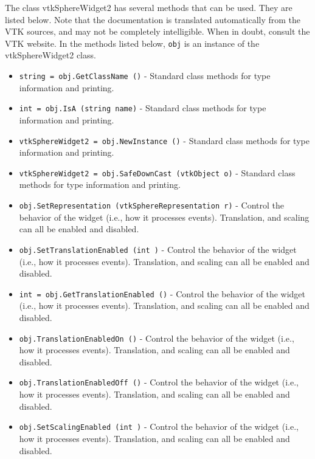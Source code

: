 The class vtkSphereWidget2 has several methods that can be used.
  They are listed below.
Note that the documentation is translated automatically from the VTK sources,
and may not be completely intelligible.  When in doubt, consult the VTK website.
In the methods listed below, \verb|obj| is an instance of the vtkSphereWidget2 class.
\begin{itemize}
\item  \verb|string = obj.GetClassName ()| -  Standard class methods for type information and printing.

\item  \verb|int = obj.IsA (string name)| -  Standard class methods for type information and printing.

\item  \verb|vtkSphereWidget2 = obj.NewInstance ()| -  Standard class methods for type information and printing.

\item  \verb|vtkSphereWidget2 = obj.SafeDownCast (vtkObject o)| -  Standard class methods for type information and printing.

\item  \verb|obj.SetRepresentation (vtkSphereRepresentation r)| -  Control the behavior of the widget (i.e., how it processes
 events). Translation, and scaling can all be enabled and disabled.

\item  \verb|obj.SetTranslationEnabled (int )| -  Control the behavior of the widget (i.e., how it processes
 events). Translation, and scaling can all be enabled and disabled.

\item  \verb|int = obj.GetTranslationEnabled ()| -  Control the behavior of the widget (i.e., how it processes
 events). Translation, and scaling can all be enabled and disabled.

\item  \verb|obj.TranslationEnabledOn ()| -  Control the behavior of the widget (i.e., how it processes
 events). Translation, and scaling can all be enabled and disabled.

\item  \verb|obj.TranslationEnabledOff ()| -  Control the behavior of the widget (i.e., how it processes
 events). Translation, and scaling can all be enabled and disabled.

\item  \verb|obj.SetScalingEnabled (int )| -  Control the behavior of the widget (i.e., how it processes
 events). Translation, and scaling can all be enabled and disabled.


\end{itemize}
